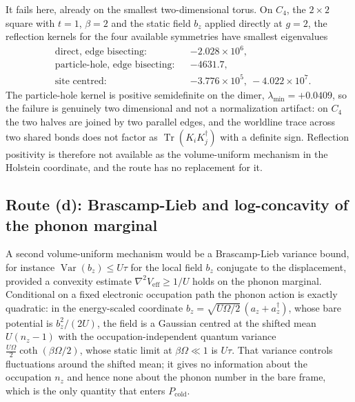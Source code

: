 \documentclass[11pt]{article}
\theoremstyle{definition}
\theoremstyle{remark}
\DeclareMathOperator{\Tr}{Tr}
\newcommand{\cold}{\mathrm{cold}}
\begin{document}
It fails here, already on the smallest two-dimensional torus. On $C_{4}$, the
$2\times2$ square with $t=1$, $\beta=2$ and the static field $b_{z}$ applied
directly at $g=2$, the reflection kernels for the four available symmetries have
smallest eigenvalues
\begin{equation}
\begin{aligned}
&\text{direct, edge bisecting:} && -2.028\times10^{6},\\
&\text{particle-hole, edge bisecting:} && -4631.7,\\
&\text{site centred:} && -3.776\times10^{5},\ -4.022\times10^{7}.
\end{aligned}
\label{eq:rp}
\end{equation}
The particle-hole kernel is positive semidefinite on the dimer,
$\lambda_{\min}=+0.0409$, so the failure is genuinely two dimensional and not a
normalization artifact: on $C_{4}$ the two halves are joined by two parallel
edges, and the worldline trace across two shared bonds does not factor as
$\Tr(K_{i}K_{j}^{\dagger})$ with a definite sign. Reflection positivity is
therefore not available as the volume-uniform mechanism in the Holstein
coordinate, and the route has no replacement for it.

\subsection{Route (d): Brascamp-Lieb and log-concavity of the phonon marginal}\label{sub:routed}

A second volume-uniform mechanism would be a Brascamp-Lieb variance bound, for
instance $\operatorname{Var}(b_{z})\le U\tau$ for the local field
$b_{z}$ conjugate to the displacement, provided a convexity estimate
$\nabla^{2}V_{\mathrm{eff}}\ge1/U$ holds on the phonon marginal. Conditional on a
fixed electronic occupation path the phonon action is exactly quadratic: in the
energy-scaled coordinate $b_{z}=\sqrt{U\Omega/2}\,(a_{z}+a_{z}^{\dagger})$, whose
bare potential is $b_{z}^{2}/(2U)$, the field is a Gaussian centred at the shifted
mean $U(n_{z}-1)$ with the occupation-independent quantum variance
$\frac{U\Omega}{2}\coth(\beta\Omega/2)$, whose static limit at $\beta\Omega\ll1$
is $U\tau$. That variance controls fluctuations around the shifted mean; it
gives no information about the occupation $n_{z}$ and hence none about the phonon
number in the bare frame, which is the only quantity that enters $P_{\cold}$.
\end{document}
